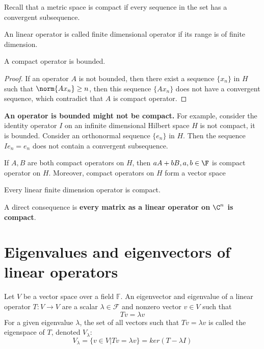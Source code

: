 \begin{refsection}
\begin{remark}
Recall that a metric space is compact if every sequence in the set has a convergent subsequence.
\end{remark}


\begin{definition}
\cite[175]{debnath2005hilbert} An linear operator is called finite dimensional operator if its range is of finite dimension.
\end{definition}



\begin{lemma}
\cite[173]{debnath2005hilbert}A compact operator is bounded. 
\end{lemma}
\begin{proof}
If an operator $A$ is not bounded, then there exist a sequence $\{x_n\}$ in $H$ such that $\norm{Ax_n} \geq n$, then this sequence $\{Ax_n\}$ does not have a convergent sequence, which contradict that $A$ is compact operator.	
\end{proof}


\begin{remark}
\textbf{An operator is bounded might not be compact.}\cite[173]{debnath2005hilbert} For example, consider the identity operator $I$ on an infinite dimensional Hilbert space $H$ is not compact, it is bounded. Consider an orthonormal sequence $\{e_n\}$ in $H$. Then the sequence $Ie_n = e_n$ does not contain a convergent subsequence. 
\end{remark}


\begin{theorem}
\cite[174]{debnath2005hilbert} If $A,B$ are both compact operators on $H$, then $aA+bB,a,b\in \F$ is compact operator on $H$. Moreover, compact operators on $H$ form a vector space
\end{theorem}


\begin{lemma}\cite[98]{krim2015geometric}
Every linear finite dimension operator is compact.
\end{lemma}


\begin{remark}
A direct consequence is \textbf{every matrix as a linear operator on $\C^n$ is compact}. 
\end{remark}

\section{Eigenvalues and eigenvectors of linear operators}
Let $V$ be a vector space over a field $\mathbb{F}$. An eigenvector and eigenvalue of a linear operator $T: V \rightarrow V$ are a scalar $\lambda \in \mathcal{F}$ and nonzero vector $v\in V$ such that
$$Tv=\lambda v$$
For a given eigenvalue $\lambda$, the set of all vectors such that $Tv = \lambda v$ is called the eigenspace of $T$, denoted $V_\lambda:$
$$V_\lambda = \{v\in V | Tv=\lambda v\} = ker(T-\lambda I)$$



\end{refsection}
